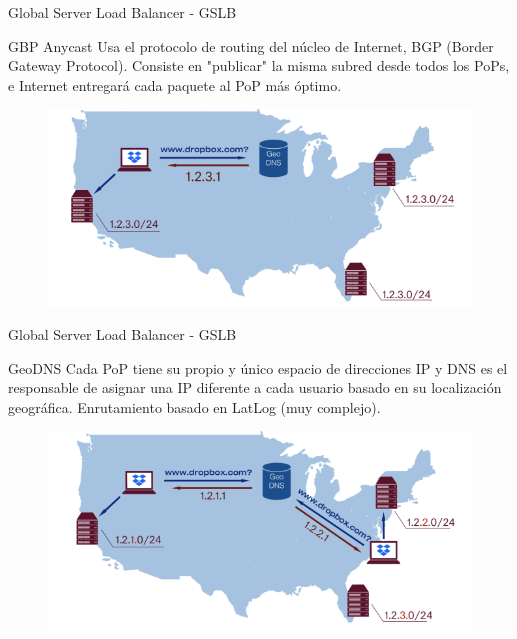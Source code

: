 \documentclass[10pt]{beamer}
\begin{document}
\begin{frame}{Global Server Load Balancer - GSLB}
\begin{alertblock}{GBP Anycast}
Usa el protocolo de routing del núcleo de Internet, BGP (Border Gateway Protocol). Consiste en "publicar" la misma subred desde todos los PoPs, e Internet entregará cada paquete al PoP más óptimo.
\end{alertblock}
\begin{figure}[h]
  \centering
  \includegraphics[width=1\linewidth]{gbp}
\end{figure}
\end{frame}


\begin{frame}{Global Server Load Balancer - GSLB}
\begin{alertblock}{GeoDNS}
Cada PoP tiene su propio y único espacio de direcciones IP y DNS es el responsable de asignar una IP diferente a cada usuario basado en su localización geográfica. Enrutamiento basado en LatLog (muy complejo).
\end{alertblock}
\begin{figure}[h]
  \centering
  \includegraphics[width=1\linewidth]{geodns}
\end{figure}
\end{frame}
\end{document}
